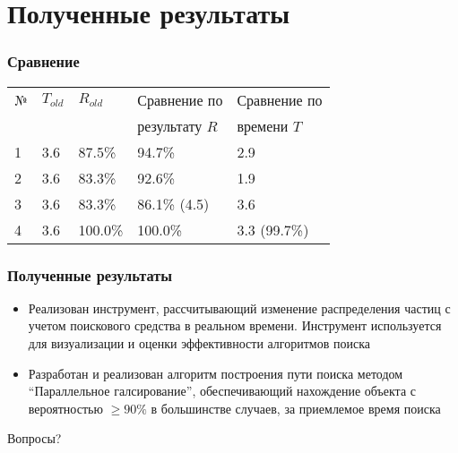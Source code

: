 \documentclass{beamer} %
\theoremstyle{definition} %
\begin{document}
\begin{comment}
\begin{frame}
\frametitle{Локальная оптимизация пути}
\begin{itemize}
\item{$k$ --- дискретных значений $h_i$}
\item{необходимо осуществить более точную подстройку $h_i$}
\item{$l_i$ --- фиксированы}
\item{$h_j, (j \neq i) \land (j \neq i+1)$ --- фиксированы, локально изменяем $\frac{h_i}{h_{i+1}}$ пока можно улучшить $S_{res}$}
\end{itemize}
\end{frame}
\end{comment}

\section{Полученные результаты}
\begin{frame}
  \frametitle{Сравнение}
\begin{table}[ht]
  \centering
  \begin{tabular}{|l|l|l|l|l|}
\hline
    № & $T_{old}$ & $R_{old}$ & Сравнение по & Сравнение по \\
         & & & результату $R$ & времени $T$ \\
\hline
    1 & 3.6 & 87.5\% & 94.7\% & 2.9 \\ 
    2 & 3.6 & 83.3\% & 92.6\% & 1.9 \\
    3 & 3.6 & 83.3\% & 86.1\% (4.5) & 3.6 \\
    4 & 3.6 & 100.0\%& 100.0\%& 3.3 (99.7\%) \\
\hline

  \end{tabular}
\end{table}

\end{frame}

\begin{frame}
\frametitle{Полученные результаты}
\begin{itemize}
\item{Реализован инструмент, рассчитывающий изменение распределения частиц с учетом поискового средства в реальном времени. Инструмент используется для визуализации и оценки эффективности алгоритмов поиска}
\item{Разработан и реализован алгоритм построения пути поиска методом ``Параллельное галсирование'', обеспечивающий нахождение объекта с вероятностью $\ge 90\%$ в большинстве случаев, за приемлемое время поиска}
\end{itemize}
\end{frame}

\begin{frame}
  \begin{center}
    \Huge
    {\color{blue} Вопросы?}
  \end{center}
\end{frame}
\end{document}
